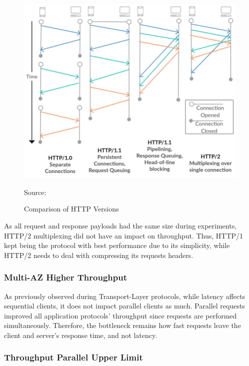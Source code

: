 \begin{figure}[h!]
    \centering
    \includegraphics[width=\linewidth]{figures/Comparison-of-HTTP-versions.jpg}
    \caption{Comparison of HTTP Versions}
    {Source: \cite{comparison_of_http_versions}}
    \label{fig:comparison_of_http_versions}
\end{figure}

As all request and response payloads had the same size during experiments, HTTP/2 multiplexing did not have an impact on throughput. Thus, HTTP/1 kept being the protocol with best performance due to its simplicity, while HTTP/2 needs to deal with compressing its requests headers.

\subsubsection*{Multi-AZ Higher Throughput}

As previously observed during Transport-Layer protocols, while latency affects sequential clients, it does not impact parallel clients as much. Parallel requests improved all application protocols' throughput since requests are performed simultaneously. Therefore, the bottleneck remains how fast requests leave the client and server's response time, and not latency.

\subsubsection*{Throughput Parallel Upper Limit}

